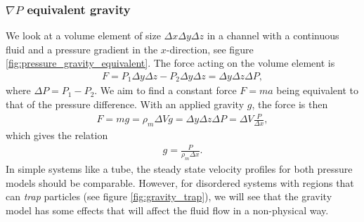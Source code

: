 \subsubsection{$\nabla P$ equivalent gravity}
We look at a volume element of size $\Delta x\Delta y\Delta z$ in a channel with a continuous fluid and a pressure gradient in the $x$-direction, see figure \ref{fig:pressure_gravity_equivalent}. The force acting on the volume element is
\begin{align}
	F = P_1\Delta y\Delta z - P_2\Delta y\Delta z = \Delta y\Delta z\Delta P,
\end{align}
where $\Delta P = P_1 - P_2$. We aim to find a constant force $F=ma$ being equivalent to that of the pressure difference. With an applied gravity $g$, the force is then
\begin{align}
	F = mg = \rho_m \Delta V g = \Delta y\Delta z\Delta P = \Delta V \frac{P}{\Delta x},
\end{align}
which gives the relation
\begin{align}
	g = \frac{P}{\rho_m\Delta x}.
\end{align}
In simple systems like a tube, the steady state velocity profiles for both pressure models should be comparable. However, for disordered systems with regions that can \textit{trap} particles (see figure \ref{fig:gravity_trap}), we will see that the gravity model has some effects that will affect the fluid flow in a non-physical way. 